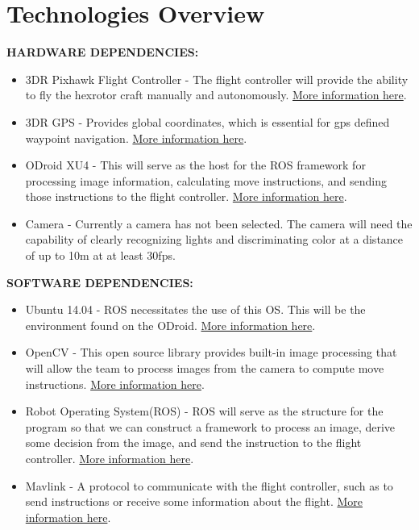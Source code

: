 \section{Technologies Overview}
\textbf{HARDWARE DEPENDENCIES:}
\begin{itemize}
\item 3DR Pixhawk Flight Controller - The flight controller will provide the ability to fly the hexrotor craft manually and autonomously. \href{https://store.3drobotics.com/products/3dr-pixhawk}{More information here}.
\item 3DR GPS - Provides global coordinates, which is essential for gps defined waypoint navigation. \href{https://store.3drobotics.com/products/3dr-gps-ublox-with-compass}{More information here}.
\item ODroid XU4 - This will serve as the host for the ROS framework for processing image information, calculating move instructions, and sending those instructions to the flight controller. \href{http://www.hardkernel.com/main/products/prdt_info.php}{More information here}.
\item Camera - Currently a camera has not been selected. The camera will need the capability of clearly recognizing lights and discriminating color at a distance of up to 10m at at least 30fps. 
\end{itemize}

\noindent\textbf{SOFTWARE DEPENDENCIES:}
\begin{itemize}
\item Ubuntu 14.04 - ROS necessitates the use of this OS. This will be the environment found on the ODroid. \href{https://wiki.ubuntu.com/TrustyTahr/ReleaseNotes}{More information here}.
\item OpenCV - This open source library provides built-in image processing that will allow the team to process images from the camera to compute move instructions.  \href{http://opencv.org/}{More information here}.
\item Robot Operating System(ROS) - ROS will serve as the structure for the program so that we can construct a framework to process an image, derive some decision from the image, and send the instruction to the flight controller. \href{http://www.ros.org/}{More information here}.
\item Mavlink - A protocol to communicate with the flight controller, such as to send instructions or receive some information about the flight. \href{https://pixhawk.ethz.ch/mavlink/}{More information here}.
\end{itemize}

